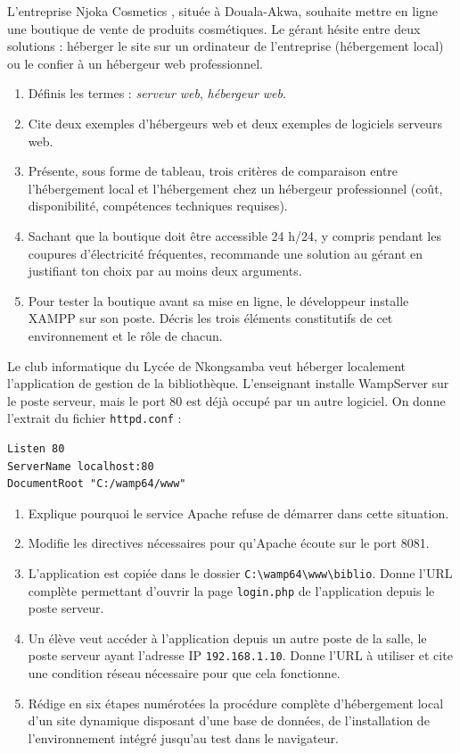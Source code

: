\documentclass[11pt]{article}
\newcounter{popsec}
\newcounter{popsub}
\newcommand{\courssub}[1]{%
  \stepcounter{popsub}%
  \par\vspace{9pt}\noindent{\popxbold\fontsize{11.5}{13}\selectfont\color{popink}{\color{poporange}\thepopsec.\thepopsub}\hspace{6pt}#1}\par\nopagebreak\vspace{4pt}
}
\begin{document}
\courssub{Je me prépare au Bac}

\begin{exercice}
L'entreprise \og Njoka Cosmetics \fg{}, située à Douala-Akwa, souhaite mettre en ligne une boutique de vente de produits cosmétiques. Le gérant hésite entre deux solutions : héberger le site sur un ordinateur de l'entreprise (hébergement local) ou le confier à un hébergeur web professionnel.
\begin{enumerate}
\item Définis les termes : \emph{serveur web}, \emph{hébergeur web}.
\item Cite deux exemples d'hébergeurs web et deux exemples de logiciels serveurs web.
\item Présente, sous forme de tableau, trois critères de comparaison entre l'hébergement local et l'hébergement chez un hébergeur professionnel (coût, disponibilité, compétences techniques requises).
\item Sachant que la boutique doit être accessible 24 h/24, y compris pendant les coupures d'électricité fréquentes, recommande une solution au gérant en justifiant ton choix par au moins deux arguments.
\item Pour tester la boutique avant sa mise en ligne, le développeur installe XAMPP sur son poste. Décris les trois éléments constitutifs de cet environnement et le rôle de chacun.
\end{enumerate}
\end{exercice}

\begin{exercice}
Le club informatique du Lycée de Nkongsamba veut héberger localement l'application de gestion de la bibliothèque. L'enseignant installe WampServer sur le poste serveur, mais le port 80 est déjà occupé par un autre logiciel. On donne l'extrait du fichier \texttt{httpd.conf} :
\begin{lstlisting}
Listen 80
ServerName localhost:80
DocumentRoot "C:/wamp64/www"
\end{lstlisting}
\begin{enumerate}
\item Explique pourquoi le service Apache refuse de démarrer dans cette situation.
\item Modifie les directives nécessaires pour qu'Apache écoute sur le port 8081.
\item L'application est copiée dans le dossier \texttt{C:\textbackslash wamp64\textbackslash www\textbackslash biblio}. Donne l'URL complète permettant d'ouvrir la page \texttt{login.php} de l'application depuis le poste serveur.
\item Un élève veut accéder à l'application depuis un autre poste de la salle, le poste serveur ayant l'adresse IP \texttt{192.168.1.10}. Donne l'URL à utiliser et cite une condition réseau nécessaire pour que cela fonctionne.
\item Rédige en six étapes numérotées la procédure complète d'hébergement local d'un site dynamique disposant d'une base de données, de l'installation de l'environnement intégré jusqu'au test dans le navigateur.
\end{enumerate}
\end{exercice}
\end{document}
